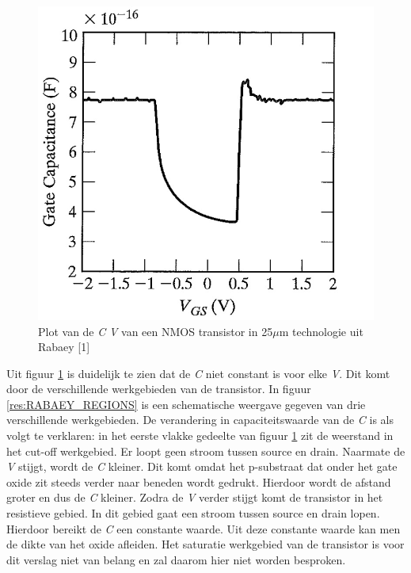  \begin{figure} [h!]
 \begin{center}
 \includegraphics [scale = 0.4] {figures/RABAEY_CAP_PLOT}
 \caption{Plot van de \emph{C}  \emph{V} van een NMOS transistor in 25$\mu$m technologie uit Rabaey [1]}
 \label{res:RABAEY_CAP_PLOT}
 \end{center}
 \end{figure}

Uit figuur \ref{res:RABAEY_CAP_PLOT} is duidelijk te zien dat de \emph{C} niet constant is voor elke \emph{V}. Dit komt door de verschillende werkgebieden van de transistor. In figuur \ref{res:RABAEY_REGIONS} is een schematische weergave gegeven van drie verschillende werkgebieden. De verandering in capaciteitswaarde van de \emph{C} is als volgt te verklaren: in het eerste vlakke gedeelte van figuur \ref{res:RABAEY_CAP_PLOT} zit de weerstand in het cut-off werkgebied. Er loopt geen stroom tussen source en drain. Naarmate de \emph{V} stijgt, wordt de \emph{C} kleiner. Dit komt omdat het p-substraat dat onder het gate oxide zit steeds verder naar beneden wordt gedrukt. Hierdoor wordt de afstand groter en dus de \emph{C} kleiner. Zodra de \emph{V} verder stijgt komt de transistor in het resistieve gebied. In dit gebied gaat een stroom tussen source en drain lopen. Hierdoor bereikt de \emph{C} een constante waarde. Uit deze constante waarde kan men de dikte van het oxide afleiden. Het saturatie werkgebied van de transistor is voor dit verslag niet van belang en zal daarom hier niet worden besproken.

